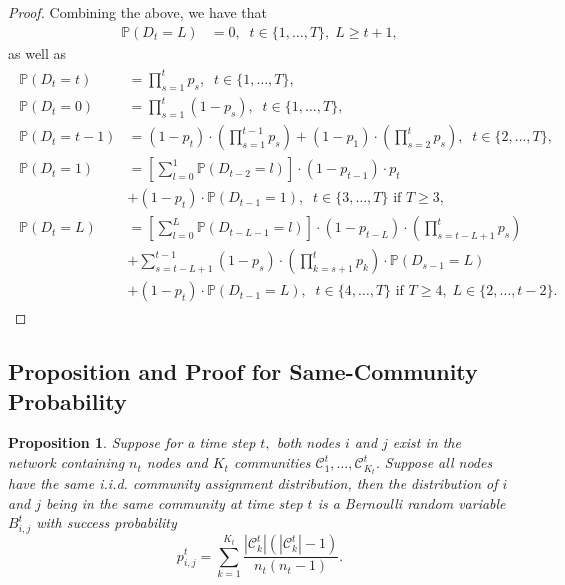 \documentclass{article}
\theoremstyle{plain}
\newtheorem{proposition}[theorem]{Proposition}
\theoremstyle{definition}
\theoremstyle{remark}
\begin{document}
\begin{proof}
Combining the above, we have that 
\begin{align*}
     \mathbb{P}(D_t=L)&=0,\;\;t\in\{1, \dots, T\}, \; L\geq t+1,
\end{align*}
as well as 
\begin{align*}
\begin{split}
    \mathbb{P}(D_t=t) &=\prod_{s=1}^t p_s, \;\; t\in\{1, \dots, T\},\\
    \mathbb{P}(D_t=0) &=\prod_{s=1}^t(1-p_s), \;\; t\in\{1, \dots, T\},\\
    \mathbb{P}(D_t=t-1)
    &=(1-p_t)\cdot\left(\prod_{s=1}^{t-1} p_s\right)+(1-p_1)\cdot\left(\prod_{s=2}^{t} p_s\right),\;\;t\in\{2, \dots, T\},\\
    \mathbb{P}(D_t=1) &=\left[\sum_{l=0}^{1}\mathbb{P}(D_{t-2}=l)\right]\cdot(1-p_{t-1})\cdot p_t\\
    &+ (1-p_t)\cdot \mathbb{P}(D_{t-1}=1), \;\;t\in\{3, \dots, T\}\text{ if }T\geq 3,\\
    \mathbb{P}(D_t=L) &=\left[\sum_{l=0}^{L}\mathbb{P}(D_{t-L-1}=l)\right]\cdot(1-p_{t-L})\cdot\left(\prod_{s=t-L+1}^t p_s\right)\\
    &+ \sum_{s=t-L+1}^{t-1}(1-p_s)\cdot\left(\prod_{k=s+1}^t p_k\right)\cdot\mathbb{P}(D_{s-1}=L)\\
    &+ (1-p_t)\cdot \mathbb{P}(D_{t-1}=L), \;\;t\in\{4, \dots, T\}\text{ if }T\geq 4,\;L\in\{2, \dots, t-2\}.
\end{split}
\end{align*}
\end{proof}
\subsection{Proposition and Proof for Same-Community Probability}
\begin{proposition}\label{prop:prob_same_community_each_time}
Suppose for a time step $t,$ both nodes $i$ and $j$ exist in the network containing $n_t$ nodes and $K_t$ communities $\mathcal{C}_1^{t}, \dots, \mathcal{C}_{K_t}^{t}.$ Suppose all nodes have the same i.i.d. community assignment distribution, then the distribution of $i$ and $j$ being in the same community at time step $t$ is a Bernoulli random variable $B_{i,j}^t$ with success probability 
\begin{equation*}
  p_{i,j}^t=\sum_{k=1}^{K_t}\frac{\left\lvert\mathcal{C}_k^{t}\right\rvert\left(\left\lvert\mathcal{C}_k^{t}\right\rvert-1\right)}{n_t(n_t-1)}.
\end{equation*}
\end{proposition}
\end{document}
